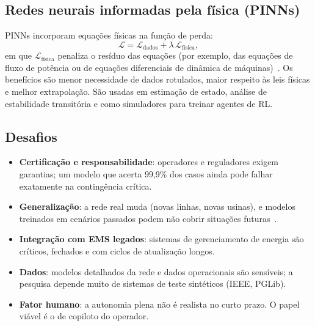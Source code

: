 \documentclass[10pt,a4paper,oneside]{article}
\begin{document}
\subsection{Redes neurais informadas pela física (PINNs)}

PINNs incorporam equações físicas na função de perda:
\begin{equation}
  \mathcal{L} = \mathcal{L}_{\text{dados}} + \lambda\, \mathcal{L}_{\text{física}},
\end{equation}
em que $\mathcal{L}_{\text{física}}$ penaliza o resíduo das equações (por
exemplo, das equações de fluxo de potência ou de equações diferenciais de
dinâmica de máquinas)~\cite{pinn}. Os benefícios são menor necessidade de dados
rotulados, maior respeito às leis físicas e melhor extrapolação. São usadas em
estimação de estado, análise de estabilidade transitória e como simuladores
para treinar agentes de RL.

\subsection{Desafios}
\begin{itemize}
  \item \textbf{Certificação e responsabilidade}: operadores e reguladores
    exigem garantias; um modelo que acerta 99,9\% dos casos ainda pode falhar
    exatamente na contingência crítica.
  \item \textbf{Generalização}: a rede real muda (novas linhas, novas
    usinas), e modelos treinados em cenários passados podem não cobrir
    situações futuras~\cite{gridgeneralization}.
  \item \textbf{Integração com EMS legados}: sistemas de gerenciamento de
    energia são críticos, fechados e com ciclos de atualização longos.
  \item \textbf{Dados}: modelos detalhados da rede e dados operacionais são
    sensíveis; a pesquisa depende muito de sistemas de teste sintéticos (IEEE,
    PGLib).
  \item \textbf{Fator humano}: a autonomia plena não é realista no curto
    prazo. O papel viável é o de copiloto do operador.
\end{itemize}
\end{document}
